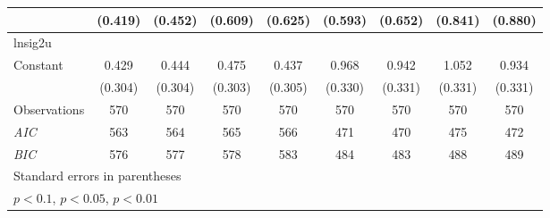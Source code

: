{\begin{tabular}{l*{8}{c}}
                    &     (0.419)         &     (0.452)         &     (0.609)         &     (0.625)         &     (0.593)         &     (0.652)         &     (0.841)         &     (0.880)         \\
\hline
lnsig2u             &                     &                     &                     &                     &                     &                     &                     &                     \\
Constant            &       0.429         &       0.444         &       0.475         &       0.437         &       0.968\sym{***}&       0.942\sym{***}&       1.052\sym{***}&       0.934\sym{***}\\
                    &     (0.304)         &     (0.304)         &     (0.303)         &     (0.305)         &     (0.330)         &     (0.331)         &     (0.331)         &     (0.331)         \\
\hline
Observations        &         570         &         570         &         570         &         570         &         570         &         570         &         570         &         570         \\
\textit{AIC}        &         563         &         564         &         565         &         566         &         471         &         470         &         475         &         472         \\
\textit{BIC}        &         576         &         577         &         578         &         583         &         484         &         483         &         488         &         489         \\
\hline\hline
\multicolumn{9}{l}{\footnotesize Standard errors in parentheses}\\
\multicolumn{9}{l}{\footnotesize \sym{*} \(p<0.1\), \sym{**} \(p<0.05\), \sym{***} \(p<0.01\)}\\
\end{tabular}
}
